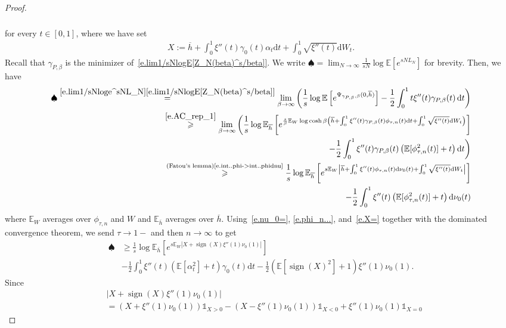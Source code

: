 \documentclass[11pt]{amsart}
\theoremstyle{remark}
\theoremstyle{definition}
\numberwithin{equation}{section}
\numberwithin{proposition}{section}
\numberwithin{figure}{section}
\numberwithin{table}{section}
\newcommand{\E}{\mathbb{E}}
\renewcommand{\geq}{\geqslant}
\renewcommand{\bar}{\overline}
\newcommand{\Ll}{\left}
\newcommand{\Rr}{\right}
\renewcommand{\d}{\mathrm{d}}
\newcommand{\1}{\mathbf{1}}
\DeclareMathOperator{\sign}{sign}
\begin{document}
\begin{proof}
\begin{align}
\begin{split}
\end{split}
\end{align}
for every $t\in[0,1]$, where we have set
\begin{align}\label{e.X=}
    X:=\bar h +\int_0^1\xi''(t)\gamma_0(t)\alpha_t\d t+ \int_0^1\sqrt{\xi''(t)}\d W_t.
\end{align}
Recall that $\gamma_{P,\beta}$ is the minimizer of~\eqref{e.lim1/sNlogE[Z_N(beta)^s/beta]}. We write $\spadesuit= \lim_{N\to \infty} \frac{1}{sN} \log \E \Ll[ e^{sN L_N} \Rr] $ for brevity. Then, we have
\begin{align*}
    \spadesuit\stackrel{\eqref{e.lim1/sNloge^sNL_N}\eqref{e.lim1/sNlogE[Z_N(beta)^s/beta]}}{=}\lim_{\beta\to\infty} \bigg( \frac{1}{s}\log\E\Ll[e^{\Psi_{\gamma_{P,\beta},\beta}(0,\bar h)}\Rr] - \frac{1}{2} \int_0^1 t \xi''(t) \gamma_{P,\beta}(t) \, \d t \bigg)
    \\
    \stackrel{\eqref{e.AC_rep_1}}{\geq}\lim_{\beta\to\infty}\bigg(\frac{1}{s}\log\E_{\bar h}\Ll[e^{\frac{s}{\beta}\E_{W}\log\cosh \beta\Ll( \bar h + \int_0^1\xi''(t)\gamma_{P,\beta}(t)\phi_{\tau,n}(t)\d t +\int_0^1\sqrt{\xi''(t)}\d W_t\Rr)}\Rr]
    \\
    -\frac{1}{2}\int_0^1 \xi''(t)\gamma_{P,\beta}(t)\Ll(\E[\phi_{\tau,n}^2(t)]+t\Rr)\d t\bigg)
    \\
    \stackrel{\text{(Fatou's lemma)\eqref{e.int..phi->int..phidnu}}}{\geq} \frac{1}{s}\log\E_{\bar h}\Ll[e^{s\E_W\Ll| \bar h + \int_0^1\xi''(t)\phi_{\tau,n}(t)\d\nu_0(t) +\int_0^1\sqrt{\xi''(t)}\d W_t\Rr|}\Rr]
    \\
    -\frac{1}{2}\int_0^1 \xi''(t)\Ll(\E[\phi_{\tau,n}^2(t)]+t\Rr)\d \nu_0(t)
\end{align*}
where $\E_W$ averages over $\phi_{\tau,n}$ and $W$ and $\E_{\bar h}$ averages over $\bar h$.
Using~\eqref{e.nu_0=}, \eqref{e.phi_n...}, and~\eqref{e.X=} together with the dominated convergence theorem, we send $\tau\to1-$ and then $n\to\infty$ to get
\begin{align*}
    \spadesuit & \geq \frac{1}{s}\log\E_{\bar h}\Ll[e^{s\E_W\Ll|X + \sign(X)\xi''(1)\nu_0(1)\Rr|}\Rr]
    \\
    &-\frac{1}{2}\int_0^1 \xi''(t)\Ll(\E[\alpha^2_t]+t\Rr)\gamma_0(t)\d t - \frac{1}{2}\Ll(\E\Ll[\sign(X)^2\Rr]+1\Rr)\xi''(1)\nu_0(1).
\end{align*}
Since
\begin{align*}
    &\Ll|X+\sign(X)\xi''(1)\nu_0(1)\Rr|
    \\
    &=\Ll(X+\xi''(1)\nu_0(1)\Rr)\mathds{1}_{X>0}- \Ll(X-\xi''(1)\nu_0(1)\Rr)\mathds{1}_{X<0}+\xi''(1)\nu_0(1)\mathds{1}_{X=0}

\end{align*}
\end{proof}
\end{document}
